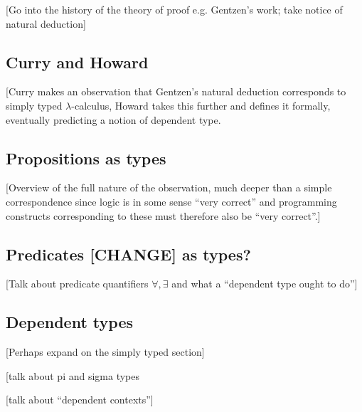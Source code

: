 [Go into the history of the theory of proof e.g. Gentzen's work; take notice of natural deduction]

\subsection{Curry and Howard}

[Curry makes an observation that Gentzen's natural deduction corresponds to simply typed $\lambda$-calculus, Howard takes this further and defines it formally, eventually predicting a notion of dependent type.

\subsection{Propositions as types}

[Overview of the full nature of the observation, much deeper than a simple correspondence since logic is in some sense ``very correct'' and programming constructs corresponding to these must therefore also be ``very correct''.]

\subsection{Predicates [CHANGE] as types?}

[Talk about predicate quantifiers $\forall, \exists$ and what a ``dependent type ought to do'']

\subsection{Dependent types}


[Perhaps expand on the simply typed section]

[talk about pi and sigma types

[talk about ``dependent contexts'']



